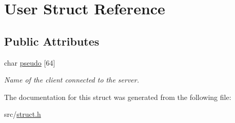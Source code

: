 \hypertarget{struct_user}{}\section{User Struct Reference}
\label{struct_user}
\subsection*{Public Attributes}
\begin{DoxyCompactItemize}
\item 
\mbox{\label{struct_user_a01a81127334b8b2a6ef5b7b60ce47ca3}} 
char \hyperlink{struct_user_a01a81127334b8b2a6ef5b7b60ce47ca3}{pseudo} \mbox{[}64\mbox{]}
\begin{DoxyCompactList}\small\item\em Name of the client connected to the server. \end{DoxyCompactList}\end{DoxyCompactItemize}


The documentation for this struct was generated from the following file\+:\begin{DoxyCompactItemize}
\item 
src/\hyperlink{struct_8h}{struct.\+h}\end{DoxyCompactItemize}
